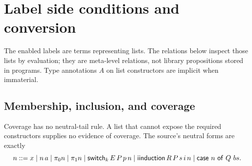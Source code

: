 \section{Label side conditions and conversion}
The enabled labels are terms representing lists. The relations below inspect those lists by evaluation; they are meta-level relations, not library propositions stored in programs. Type annotations $A$ on list constructors are implicit when immaterial.
\subsection{Membership, inclusion, and coverage}
Coverage has no neutral-tail rule. A list that cannot expose the required constructors supplies no evidence of coverage. The source's neutral forms are exactly
\[
 n::=x\mid n\,a\mid\pi_0n\mid\pi_1n\mid
 \mathsf{switch}_k\,E\,P\,p\,n\mid
 \mathsf{iinduction}\,R\,P\,s\,i\,n\mid
 \mathsf{case}\ n\ \mathsf{of}\ Q\ bs.
\]

